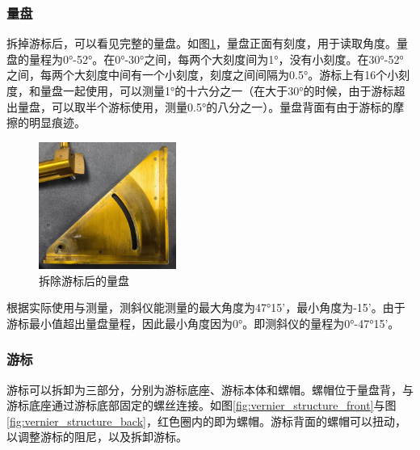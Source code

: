 \documentclass[UTF8]{ctexart}
\begin{document}
\subsubsection{量盘}

拆掉游标后，可以看见完整的量盘。如图\ref{fig:clinometer_structure_face_disassembled}，量盘正面有刻度，用于读取角度。量盘的量程为0°-52°。在0°-30°之间，每两个大刻度间为1°，没有小刻度。在30°-52°之间，每两个大刻度中间有一个小刻度，刻度之间间隔为0.5°。游标上有16个小刻度，和量盘一起使用，可以测量1°的十六分之一（在大于30°的时候，由于游标超出量盘，可以取半个游标使用，测量0.5°的八分之一）。量盘背面有由于游标的摩擦的明显痕迹。

\begin{figure}[h]
    \centering
    \includegraphics[width=0.4\textwidth]{img/clinometer_structure_face_disassembled}
    \caption{拆除游标后的量盘}
    \label{fig:clinometer_structure_face_disassembled}
\end{figure}

根据实际使用与测量，测斜仪能测量的最大角度为47°15'，最小角度为-15'。由于游标最小值超出量盘量程，因此最小角度因为0°。即测斜仪的量程为0°-47°15'。

\subsubsection{游标}

游标可以拆卸为三部分，分别为游标底座、游标本体和螺帽。螺帽位于量盘背，与游标底座通过游标底部固定的螺丝连接。如图\ref{fig:vernier_structure_front}与图\ref{fig:vernier_structure_back}，红色圈内的即为螺帽。游标背面的螺帽可以扭动，以调整游标的阻尼，以及拆卸游标。
\end{document}
